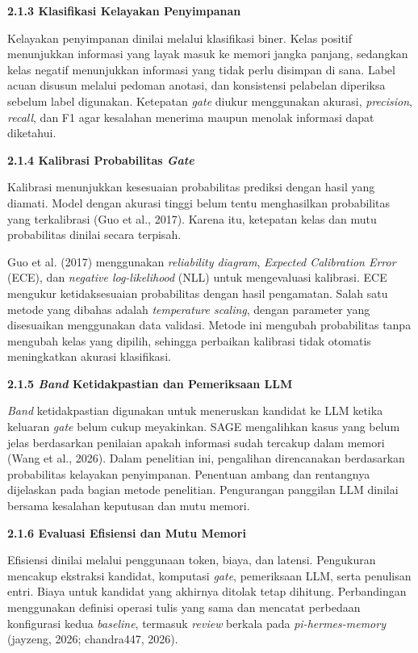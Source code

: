 \documentclass[12pt,a4paper]{article}
\newcommand{\asing}[1]{\textit{#1}}
\newcommand{\phm}{\textit{pi-hermes-memory}}
\newcommand{\subsubbab}[2]{%
  \par\vspace{0.5em}\phantomsection\label{#2}%
  \noindent\textbf{#1}\par\nopagebreak\vspace{0.2em}}
\begin{document}
\subsubbab{2.1.3 Klasifikasi Kelayakan Penyimpanan}{sec:2.1.3}

Kelayakan penyimpanan dinilai melalui klasifikasi biner. Kelas positif menunjukkan informasi yang layak masuk ke memori jangka panjang, sedangkan kelas negatif menunjukkan informasi yang tidak perlu disimpan di sana. Label acuan disusun melalui pedoman anotasi, dan konsistensi pelabelan diperiksa sebelum label digunakan. Ketepatan \asing{gate} diukur menggunakan akurasi, \asing{precision}, \asing{recall}, dan F1 agar kesalahan menerima maupun menolak informasi dapat diketahui.

\subsubbab{2.1.4 Kalibrasi Probabilitas \asing{Gate}}{sec:2.1.4}

Kalibrasi menunjukkan kesesuaian probabilitas prediksi dengan hasil yang diamati. Model dengan akurasi tinggi belum tentu menghasilkan probabilitas yang terkalibrasi (Guo et al., 2017). Karena itu, ketepatan kelas dan mutu probabilitas dinilai secara terpisah.

Guo et al. (2017) menggunakan \asing{reliability diagram}, \asing{Expected Calibration Error} (ECE), dan \asing{negative log-likelihood} (NLL) untuk mengevaluasi kalibrasi. ECE mengukur ketidaksesuaian probabilitas dengan hasil pengamatan. Salah satu metode yang dibahas adalah \asing{temperature scaling}, dengan parameter yang disesuaikan menggunakan data validasi. Metode ini mengubah probabilitas tanpa mengubah kelas yang dipilih, sehingga perbaikan kalibrasi tidak otomatis meningkatkan akurasi klasifikasi.

\subsubbab{2.1.5 \asing{Band} Ketidakpastian dan Pemeriksaan LLM}{sec:2.1.5}

\asing{Band} ketidakpastian digunakan untuk meneruskan kandidat ke LLM ketika keluaran \asing{gate} belum cukup meyakinkan. SAGE mengalihkan kasus yang belum jelas berdasarkan penilaian apakah informasi sudah tercakup dalam memori (Wang et al., 2026). Dalam penelitian ini, pengalihan direncanakan berdasarkan probabilitas kelayakan penyimpanan. Penentuan ambang dan rentangnya dijelaskan pada bagian metode penelitian. Pengurangan panggilan LLM dinilai bersama kesalahan keputusan dan mutu memori.

\subsubbab{2.1.6 Evaluasi Efisiensi dan Mutu Memori}{sec:2.1.6}

Efisiensi dinilai melalui penggunaan token, biaya, dan latensi. Pengukuran mencakup ekstraksi kandidat, komputasi \asing{gate}, pemeriksaan LLM, serta penulisan entri. Biaya untuk kandidat yang akhirnya ditolak tetap dihitung. Perbandingan menggunakan definisi operasi tulis yang sama dan mencatat perbedaan konfigurasi kedua \asing{baseline}, termasuk \asing{review} berkala pada \phm{} (jayzeng, 2026; chandra447, 2026).
\end{document}
